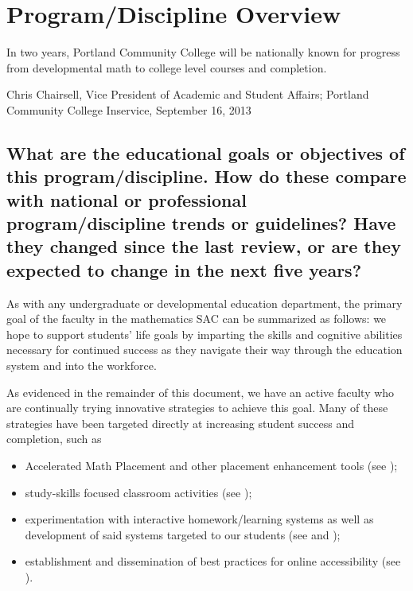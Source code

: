 \chapter{Program/Discipline Overview}

\epigraph{In two years, Portland Community College will be nationally known for
progress from developmental math to college level courses and completion.}
{Chris Chairsell, Vice President of Academic and Student Affairs; Portland 
Community College Inservice, September 16, 2013}

\section[Educational objectives]{What are the educational goals or objectives of this
program/discipline.   How do these compare with national or professional
program/discipline trends or guidelines?   Have they changed since the last
review, or are they expected to change in the next five years? }

As with any undergraduate or developmental education department, the primary
goal of the faculty in the mathematics SAC can be summarized as follows: we hope
to support students' life goals by imparting the skills and cognitive
abilities necessary for continued success as they navigate their way through the
education system and into the workforce.

As evidenced in the remainder of this document, we have an active faculty who
are continually trying innovative strategies to achieve this goal.  Many of
these strategies have been targeted directly at increasing student success and
completion, such as
\begin{itemize}
  \item Accelerated Math Placement and other placement enhancement tools
    (see );
  \item study-skills focused classroom activities (see );
  \item experimentation with interactive homework/learning systems as well as
  development of said systems targeted to our students (see  and );
  \item establishment and dissemination of best practices for 
    online accessibility (see ).
\end{itemize}

